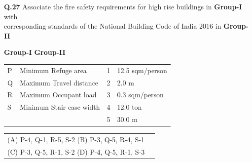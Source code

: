 \documentclass{article}
\begin{document}
 \vspace{0.8cm}
\noindent \textbf{Q.27} \quad Associate the fire safety requirements for high rise buildings in \textbf{Group-I} with \\
\hspace*{3.3em} corresponding standards of the National Building Code of India 2016 in \textbf{Group-II} 

\vspace{1em}


\hspace{3cm} \textbf{Group-I} \hspace{8cm} \textbf{Group-II} \\ 
\vspace{0.5cm}
\begin{tabular}{llcl} \vspace{0.15cm}
\hspace{2cm}P & Minimum Refuge area & \hspace{4.4cm} 1 & 12.5 sqm/person \\ \vspace{0.15cm}
\hspace{2cm}Q & Maximum Travel distance &\hspace{4.4cm} 2 & 2.0 m \\  \vspace{0.15cm}
\hspace{2cm}R & Maximum Occupant load & \hspace{4.4cm} 3 & 0.3 sqm/person \\ \vspace{0.15cm}
\hspace{2cm}S & Minimum Stair case width & \hspace{4.4cm}4 & 12.0 ton \\ \vspace{0.15cm} 
  &                           & \hspace{4.4cm}5 & 30.0 m \\
\end{tabular}

\bigskip

\begin{tabular}{ll}
\hspace{2cm}(A)  P-4, Q-1, R-5, S-2 
\hspace{4cm}(B)  P-3, Q-5, R-4, S-1 \\  \vspace{0.5cm}
\hspace{2cm}(C)  P-3, Q-5, R-1, S-2 
\hspace{4cm}(D)  P-4, Q-5, R-1, S-3 
\end{tabular}
\end{document}
